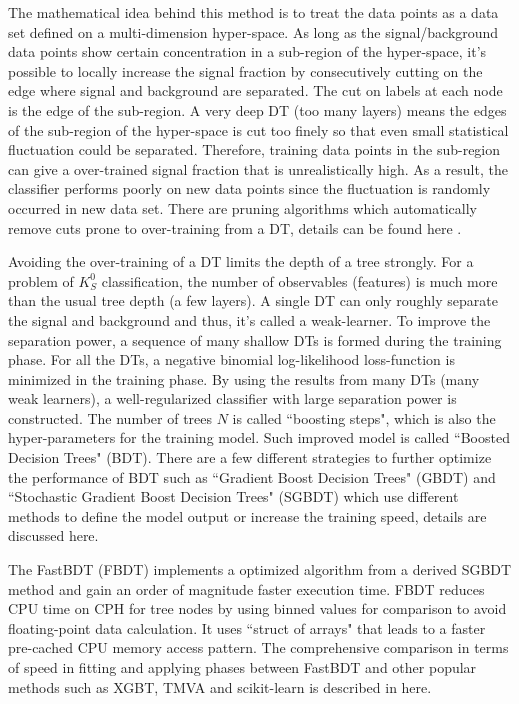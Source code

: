 The mathematical idea behind this method is to treat the data points as a data set defined on a multi-dimension hyper-space. As long as the signal/background data points show certain concentration in a sub-region of the hyper-space, it's possible to locally increase the signal fraction by consecutively cutting on the edge where signal and background are separated. The cut on labels at each node is the edge of the sub-region. A very deep DT (too many layers) means the edges of the sub-region of the hyper-space is cut too finely so that even small statistical fluctuation could be separated. Therefore, training data points in the sub-region can give a over-trained signal fraction that is unrealistically high. As a result, the classifier performs poorly on new data points since the fluctuation is randomly occurred in new data set. There are pruning algorithms which automatically remove cuts prone to over-training
from a DT, details can be found here \cite{olshen1984classification}.

Avoiding the over-training of a DT limits the depth of a tree strongly. For a problem of $K_S^0$ classification, the number of observables (features) is much more than the usual tree depth (a few layers). A single DT can only roughly separate the signal and background and thus, it's called a weak-learner. To improve the separation power, a sequence of many shallow DTs is formed during the training phase. For all the DTs, a negative binomial log-likelihood loss-function is minimized in the training phase. By using the results from many DTs (many weak learners), a well-regularized classifier with large separation power is constructed. The number of trees $N$ is called ``boosting steps", which is also the hyper-parameters for the training model. Such improved model is called ``Boosted Decision Trees" (BDT). There are a few different strategies to further optimize the performance of BDT such as ``Gradient Boost Decision Trees" (GBDT) and ``Stochastic Gradient Boost Decision Trees" (SGBDT) which use different methods to define the model output or increase the training speed, details are discussed here\cite{friedman2002stochastic}.


The FastBDT (FBDT) implements a optimized algorithm from a derived SGBDT method \cite{friedman2001greedy} and gain an order of magnitude faster execution time. FBDT reduces CPU time on CPH for tree nodes by using binned values for comparison to avoid  ﬂoating-point data calculation. It uses ``struct of arrays" that leads to a faster pre-cached CPU memory access pattern. The comprehensive comparison in terms of speed in fitting and applying phases between FastBDT and other popular methods such as XGBT, TMVA and scikit-learn is described in here\cite{keck2016fastbdt}. 

